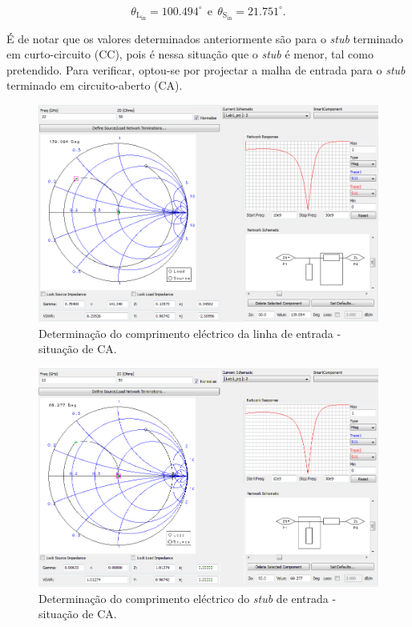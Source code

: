 \documentclass[11pt]{article}
\numberwithin{equation}{section}
\begin{document}
\vspace{-3mm}
\begin{equation}
	\theta_{\text{L}_{\text{in}}} = 100.494^{\circ}  ~~ \text{e} ~~ \theta_{\text{S}_{\text{in}}} = 21.751^{\circ}.
\end{equation}

\vspace{1mm} 
É de notar que os valores determinados anteriormente são para o \textit{stub} terminado em curto-circuito (CC), pois é nessa situação que o \textit{stub} é menor, tal como pretendido. Para verificar, optou-se por projectar a malha de entrada para o \textit{stub} terminado em circuito-aberto (CA).

\begin{figure}[H]
	\centering
	\includegraphics[keepaspectratio=true, scale=0.45]{exps/Gerador_Ca_line}
	\vspace{-0.5em}
	\caption{Determinação do comprimento eléctrico da linha de entrada - situação de CA.}
	\vspace{-0.8em}
\end{figure}

\begin{figure}[H]
	\centering
	\includegraphics[keepaspectratio=true, scale=0.45]{exps/Gerador_Ca_stub}
	\vspace{-0.5em}
	\caption{Determinação do comprimento eléctrico do \textit{stub} de entrada - situação de CA.}
	\vspace{-0.8em}
\end{figure}
\end{document}
